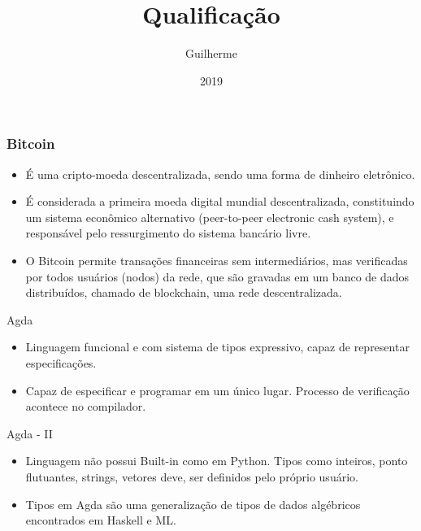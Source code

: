 \documentclass{beamer}
\title{Qualificação}
\author{Guilherme}
\institute{FGV}
\date{2019}
\begin{document}
 
\frame{\titlepage}
 
\begin{frame}
\frametitle{Bitcoin}
\begin{itemize}
    \item É uma cripto-moeda descentralizada, sendo uma forma de dinheiro eletrônico.
    \item É considerada a primeira moeda digital mundial descentralizada, constituindo um sistema econômico alternativo (peer-to-peer electronic cash system), e responsável pelo ressurgimento do sistema bancário livre.
    \item O Bitcoin permite transações financeiras sem intermediários, mas verificadas por todos usuários (nodos) da rede, que são gravadas em um banco de dados distribuídos, chamado de blockchain, uma rede descentralizada.
\end{itemize}
\end{frame}
 
 \begin{frame}{Agda}
 \begin{itemize}
     \item Linguagem funcional e com sistema de tipos expressivo, capaz de representar especificações.
     \item Capaz de especificar e programar em um único lugar. Processo de verificação acontece no compilador.
 \end{itemize}
 \end{frame}
 
 \begin{frame}{Agda - II}
 \begin{itemize}
     \item Linguagem não possui Built-in como em Python. Tipos como inteiros, ponto flutuantes, strings, vetores deve, ser definidos pelo próprio usuário.
     \item Tipos em Agda são uma generalização de tipos de dados algébricos encontrados em Haskell e ML.
 \end{itemize}
 \end{frame}
 
\end{document}
